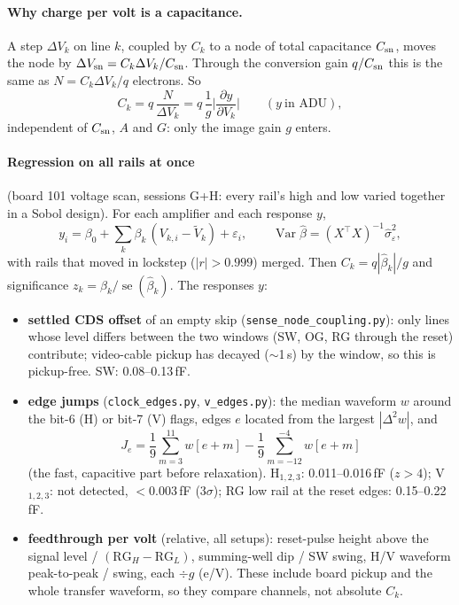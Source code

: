 \documentclass[10pt,a4paper]{article}
\newcommand{\code}[1]{\texttt{\small #1}}
\begin{document}
\paragraph{Why charge per volt is a capacitance.} A step $\Delta V_k$ on line $k$, coupled by $C_k$ to a node of total
capacitance $C_{\rm sn}$, moves the node by $\Delta V_{\rm sn}=C_k\Delta V_k/C_{\rm sn}$. Through the conversion gain
$q/C_{\rm sn}$ this is the same as $N=C_k\Delta V_k/q$ electrons. So
\begin{equation}
\boxed{C_k=q\,\frac{N}{\Delta V_k}=q\,\frac{1}{g}\Big|\frac{\partial y}{\partial V_k}\Big|}\qquad(y\ \text{in ADU}),
\end{equation}
independent of $C_{\rm sn}$, $A$ and $G$: only the image gain $g$ enters.

\paragraph{Regression on all rails at once} (board 101 voltage scan, sessions G+H: every rail's high and low varied
together in a Sobol design). For each amplifier and each response $y$,
\begin{equation}
y_i=\beta_0+\sum_k\beta_k\,(V_{k,i}-\tilde V_k)+\varepsilon_i,\qquad
\operatorname{Var}\hat\beta=(X^\top X)^{-1}\hat\sigma^2_\varepsilon ,
\end{equation}
with rails that moved in lockstep ($|r|>0.999$) merged. Then $C_k=q|\hat\beta_k|/g$ and significance $z_k=\hat\beta_k/
\operatorname{se}(\hat\beta_k)$. The responses $y$:
\begin{itemize}
\item \textbf{settled CDS offset} of an empty skip (\code{sense\_node\_coupling.py}): only lines whose level differs
between the two windows (SW, OG, RG through the reset) contribute; video-cable pickup has decayed ($\sim$1\,\textmu s)
by the window, so this is pickup-free. SW: 0.08--0.13\,fF.
\item \textbf{edge jumps} (\code{clock\_edges.py}, \code{v\_edges.py}): the median waveform $w$ around the bit-6 (H) or
bit-7 (V) flags, edges $e$ located from the largest $|\Delta^2w|$, and
\begin{equation}
J_e=\frac19\sum_{m=3}^{11}w[e+m]-\frac19\sum_{m=-12}^{-4}w[e+m]
\end{equation}
(the fast, capacitive part before relaxation). H$_{1,2,3}$: 0.011--0.016\,fF ($z>4$); V$_{1,2,3}$: not detected,
$<0.003$\,fF (3$\sigma$); RG low rail at the reset edges: 0.15--0.22\,fF.
\item \textbf{feedthrough per volt} (relative, all setups): reset-pulse height above the signal level / $(\text{RG}_H-\text{RG}_L)$,
summing-well dip / SW swing, H/V waveform peak-to-peak / swing, each $\div g$ (e/V). These include board pickup and the
whole transfer waveform, so they compare channels, not absolute $C_k$.
\end{itemize}
\end{document}
